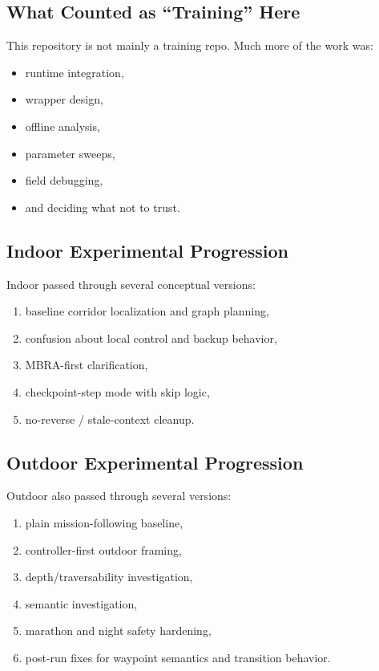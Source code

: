 \documentclass[11pt]{article}
\begin{document}
\subsection{What Counted as ``Training'' Here}

This repository is not mainly a training repo. Much more of the work was:

\begin{itemize}[nosep]
  \item runtime integration,
  \item wrapper design,
  \item offline analysis,
  \item parameter sweeps,
  \item field debugging,
  \item and deciding what not to trust.
\end{itemize}

\subsection{Indoor Experimental Progression}

Indoor passed through several conceptual versions:

\begin{enumerate}[nosep]
  \item baseline corridor localization and graph planning,
  \item confusion about local control and backup behavior,
  \item MBRA-first clarification,
  \item checkpoint-step mode with skip logic,
  \item no-reverse / stale-context cleanup.
\end{enumerate}

\subsection{Outdoor Experimental Progression}

Outdoor also passed through several versions:

\begin{enumerate}[nosep]
  \item plain mission-following baseline,
  \item controller-first outdoor framing,
  \item depth/traversability investigation,
  \item semantic investigation,
  \item marathon and night safety hardening,
  \item post-run fixes for waypoint semantics and transition behavior.
\end{enumerate}
\end{document}
